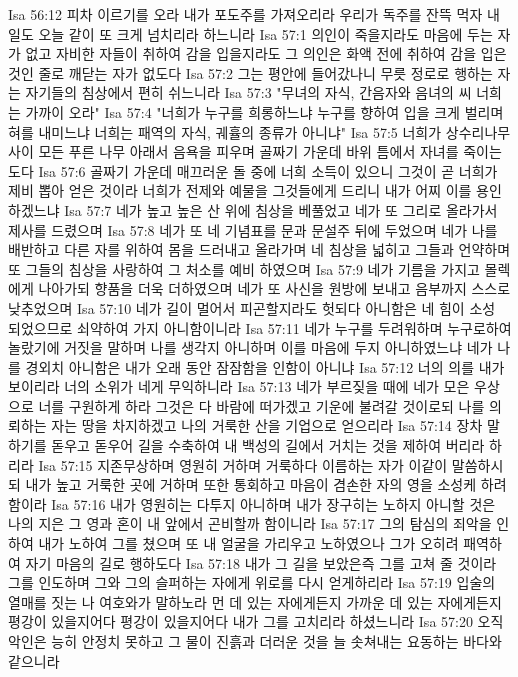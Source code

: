 Isa 56:12  피차 이르기를 오라 내가 포도주를 가져오리라 우리가 독주를 잔뜩 먹자 내일도 오늘 같이 또 크게 넘치리라 하느니라
Isa 57:1  의인이 죽을지라도 마음에 두는 자가 없고 자비한 자들이 취하여 감을 입을지라도 그 의인은 화액 전에 취하여 감을 입은 것인 줄로 깨닫는 자가 없도다
Isa 57:2  그는 평안에 들어갔나니 무릇 정로로 행하는 자는 자기들의 침상에서 편히 쉬느니라
Isa 57:3  "무녀의 자식, 간음자와 음녀의 씨 너희는 가까이 오라"
Isa 57:4  "너희가 누구를 희롱하느냐 누구를 향하여 입을 크게 벌리며 혀를 내미느냐 너희는 패역의 자식, 궤휼의 종류가 아니냐"
Isa 57:5  너희가 상수리나무 사이 모든 푸른 나무 아래서 음욕을 피우며 골짜기 가운데 바위 틈에서 자녀를 죽이는도다
Isa 57:6  골짜기 가운데 매끄러운 돌 중에 너희 소득이 있으니 그것이 곧 너희가 제비 뽑아 얻은 것이라 너희가 전제와 예물을 그것들에게 드리니 내가 어찌 이를 용인하겠느냐
Isa 57:7  네가 높고 높은 산 위에 침상을 베풀었고 네가 또 그리로 올라가서 제사를 드렸으며
Isa 57:8  네가 또 네 기념표를 문과 문설주 뒤에 두었으며 네가 나를 배반하고 다른 자를 위하여 몸을 드러내고 올라가며 네 침상을 넓히고 그들과 언약하며 또 그들의 침상을 사랑하여 그 처소를 예비 하였으며
Isa 57:9  네가 기름을 가지고 몰렉에게 나아가되 향품을 더욱 더하였으며 네가 또 사신을 원방에 보내고 음부까지 스스로 낮추었으며
Isa 57:10  네가 길이 멀어서 피곤할지라도 헛되다 아니함은 네 힘이 소성 되었으므로 쇠약하여 가지 아니함이니라
Isa 57:11  네가 누구를 두려워하며 누구로하여 놀랐기에 거짓을 말하며 나를 생각지 아니하며 이를 마음에 두지 아니하였느냐 네가 나를 경외치 아니함은 내가 오래 동안 잠잠함을 인함이 아니냐
Isa 57:12  너의 의를 내가 보이리라 너의 소위가 네게 무익하니라
Isa 57:13  네가 부르짖을 때에 네가 모은 우상으로 너를 구원하게 하라 그것은 다 바람에 떠가겠고 기운에 불려갈 것이로되 나를 의뢰하는 자는 땅을 차지하겠고 나의 거룩한 산을 기업으로 얻으리라
Isa 57:14  장차 말하기를 돋우고 돋우어 길을 수축하여 내 백성의 길에서 거치는 것을 제하여 버리라 하리라
Isa 57:15  지존무상하며 영원히 거하며 거룩하다 이름하는 자가 이같이 말씀하시되 내가 높고 거룩한 곳에 거하며 또한 통회하고 마음이 겸손한 자의 영을 소성케 하려 함이라
Isa 57:16  내가 영원히는 다투지 아니하며 내가 장구히는 노하지 아니할 것은 나의 지은 그 영과 혼이 내 앞에서 곤비할까 함이니라
Isa 57:17  그의 탐심의 죄악을 인하여 내가 노하여 그를 쳤으며 또 내 얼굴을 가리우고 노하였으나 그가 오히려 패역하여 자기 마음의 길로 행하도다
Isa 57:18  내가 그 길을 보았은즉 그를 고쳐 줄 것이라 그를 인도하며 그와 그의 슬퍼하는 자에게 위로를 다시 얻게하리라
Isa 57:19  입술의 열매를 짓는 나 여호와가 말하노라 먼 데 있는 자에게든지 가까운 데 있는 자에게든지 평강이 있을지어다 평강이 있을지어다 내가 그를 고치리라 하셨느니라
Isa 57:20  오직 악인은 능히 안정치 못하고 그 물이 진흙과 더러운 것을 늘 솟쳐내는 요동하는 바다와 같으니라
